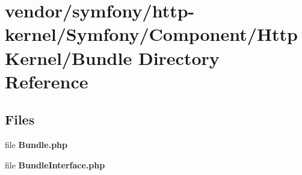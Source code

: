 \section{vendor/symfony/http-\/kernel/\+Symfony/\+Component/\+Http\+Kernel/\+Bundle Directory Reference}
\label{dir_34bcd166aa2ff63885bcb0d45bbc0e78}
\subsection*{Files}
\begin{DoxyCompactItemize}
\item 
file {\bf Bundle.\+php}
\item 
file {\bf Bundle\+Interface.\+php}
\end{DoxyCompactItemize}
